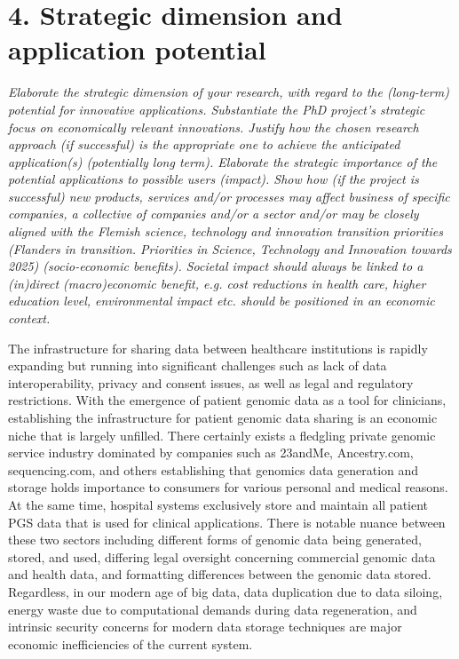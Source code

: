 \documentclass[11pt]{article}
\begin{document}
\section{4. Strategic dimension and application potential}
\textit{Elaborate the strategic dimension of your research, with regard to the (long-term) potential for innovative applications. 
Substantiate the PhD project’s strategic focus on economically relevant innovations. Justify how the chosen research approach (if successful) is the appropriate one to achieve the anticipated application(s) (potentially long term).
Elaborate the strategic importance of the potential applications to possible users (impact). Show how (if the project is successful) new products, services and/or processes may affect business of specific companies, a collective of companies and/or a sector and/or may be closely aligned with the Flemish science, technology and innovation transition priorities  (Flanders in transition. Priorities in Science, Technology and Innovation towards 2025) (socio-economic benefits). Societal impact should always be linked to a (in)direct (macro)economic benefit, e.g. cost reductions in health care, higher education level, environmental impact etc. should be positioned in an economic context.}

The infrastructure for sharing data between healthcare institutions is rapidly expanding but running into significant challenges such as lack of data interoperability, privacy and consent issues, as well as legal and regulatory restrictions. 
With the emergence of patient genomic data as a tool for clinicians, establishing the infrastructure for patient genomic data sharing is an economic niche that is largely unfilled. 
There certainly exists a fledgling private genomic service industry dominated by companies such as 23andMe, Ancestry.com, sequencing.com, and others establishing that genomics data generation and storage holds importance to consumers for various personal and medical reasons. 
At the same time, hospital systems exclusively store and maintain all patient PGS data that is used for clinical applications. 
There is notable nuance between these two sectors including different forms of genomic data being generated, stored, and used, differing legal oversight concerning commercial genomic data and health data, and formatting differences between the genomic data stored. 
Regardless, in our modern age of big data, data duplication due to data siloing, energy waste due to computational demands during data regeneration, and intrinsic security concerns for modern data storage techniques are major economic inefficiencies of the current system. 
\end{document}
